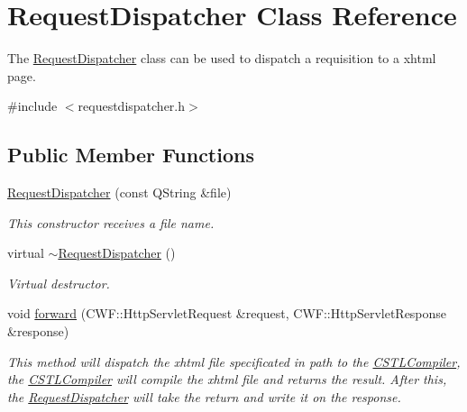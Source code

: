\hypertarget{class_request_dispatcher}{}\section{Request\+Dispatcher Class Reference}
\label{class_request_dispatcher}


The \hyperlink{class_request_dispatcher}{Request\+Dispatcher} class can be used to dispatch a requisition to a xhtml page.  




{\ttfamily \#include $<$requestdispatcher.\+h$>$}

\subsection*{Public Member Functions}
\begin{DoxyCompactItemize}
\item 
\mbox{\label{class_request_dispatcher_a3251b6940f8b27a889b52617853338a0}} 
\hyperlink{class_request_dispatcher_a3251b6940f8b27a889b52617853338a0}{Request\+Dispatcher} (const Q\+String \&file)
\begin{DoxyCompactList}\small\item\em This constructor receives a file name. \end{DoxyCompactList}\item 
\mbox{\label{class_request_dispatcher_a19ee59b1fe3c38be480c181cc3408c45}} 
virtual \hyperlink{class_request_dispatcher_a19ee59b1fe3c38be480c181cc3408c45}{$\sim$\+Request\+Dispatcher} ()
\begin{DoxyCompactList}\small\item\em Virtual destructor. \end{DoxyCompactList}\item 
void \hyperlink{class_request_dispatcher_ad3d0b282d2c9cd0d850931167a698797}{forward} (C\+W\+F\+::\+Http\+Servlet\+Request \&request, C\+W\+F\+::\+Http\+Servlet\+Response \&response)
\begin{DoxyCompactList}\small\item\em This method will dispatch the xhtml file specificated in path to the \hyperlink{class_c_s_t_l_compiler}{C\+S\+T\+L\+Compiler}, the \hyperlink{class_c_s_t_l_compiler}{C\+S\+T\+L\+Compiler} will compile the xhtml file and returns the result. After this, the \hyperlink{class_request_dispatcher}{Request\+Dispatcher} will take the return and write it on the response. \end{DoxyCompactList}\end{DoxyCompactItemize}


